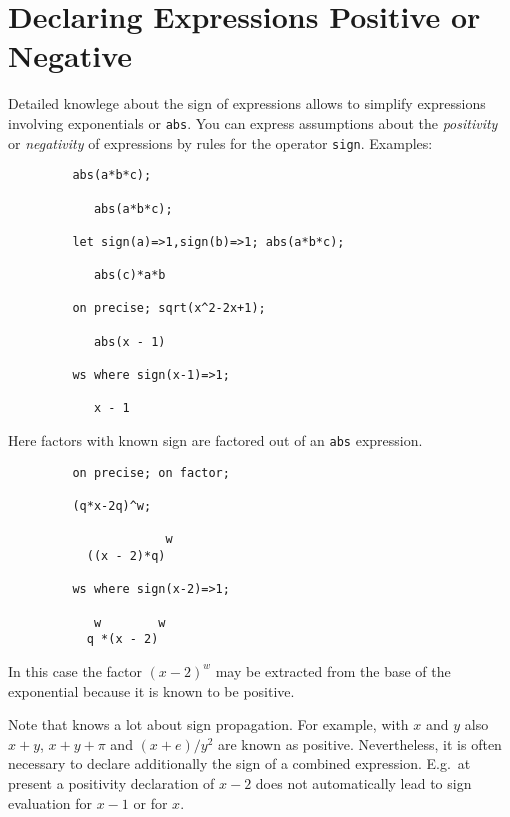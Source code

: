 \section{Declaring Expressions Positive or Negative}

Detailed knowlege about the sign of expressions allows {\REDUCE}
to simplify expressions involving exponentials or \texttt{abs}.
You can express assumptions about the 
\emph{positivity} or \emph{negativity}
of expressions by rules for the operator \texttt{sign}.
Examples:
\begin{verbatim}
         abs(a*b*c);
      
            abs(a*b*c);

         let sign(a)=>1,sign(b)=>1; abs(a*b*c);

            abs(c)*a*b

         on precise; sqrt(x^2-2x+1);

            abs(x - 1)

         ws where sign(x-1)=>1;

            x - 1
\end{verbatim}
Here factors with known sign are factored out of an \texttt{abs} expression.
\begin{verbatim}
         on precise; on factor; 

         (q*x-2q)^w;

                      w
           ((x - 2)*q)

         ws where sign(x-2)=>1;

            w        w
           q *(x - 2)

\end{verbatim}
       
In this case the factor $(x-2)^w$ may be extracted from the base
of the exponential because it is known to be positive.

Note that {\REDUCE} knows a lot about sign propagation.
For example, with $x$ and $y$ also $x+y$, $x+y+\pi$ and $(x+e)/y^2$
are known as positive.
Nevertheless, it is often necessary to declare additionally the sign of a 
combined expression. E.g.\ at present a positivity declaration of $x-2$ does not 
automatically lead to sign evaluation for $x-1$ or for $x$.

